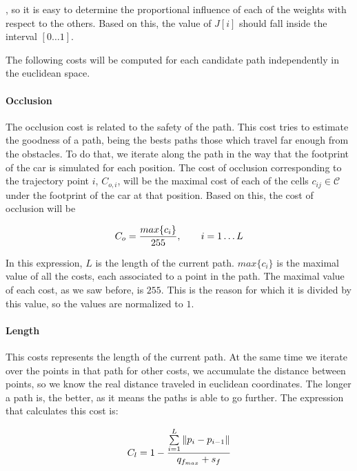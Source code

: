 , so it is easy to determine the proportional influence of each of the weights with respect to the others. Based on this, the value of $J[i]$ should fall inside the interval $[0\dots1]$.

The following costs will be computed for each candidate path independently in the euclidean space.

\paragraph{Occlusion}\label{ch:chapter07_01_04_00_01}

The occlusion cost is related to the safety of the path. This cost tries to estimate the goodness of a path, being the bests paths those which travel far enough from the obstacles. To do that, we iterate along the path in the way that the footprint of the car is simulated for each position. The cost of occlusion corresponding to the trajectory point $i$, $C_{o,i}$, will be the maximal cost of each of the cells $c_{ij} \in \mathcal{C}$ under the footprint of the car at that position. Based on this, the cost of occlusion will be

\begin{equation}\label{eq:cp07_occlusion_cost}
C_o = {{max\{c_i\}} \over 255}, ~~~~~~ i=1 \dots L
\end{equation}

In this expression, $L$ is the length of the current path. $max\{c_i\}$ is the maximal value of all the costs, each associated to a point in the path. The maximal value of each cost, as we saw before, is $255$. This is the reason for which it is divided by this value, so the values are normalized to $1$.

\paragraph{Length}\label{ch:chapter07_01_04_00_02}

This costs represents the length of the current path. At the same time we iterate over the points in that path for other costs, we accumulate the distance between points, so we know the real distance traveled in euclidean coordinates. The longer a path is, the better, as it means the paths is able to go further. The expression that calculates this cost is:

\begin{equation}\label{eq:cp07_length_cost}
C_l = 1- {{\sum\limits_{i=1}^{L}\|p_i - p_{i - 1}\|} \over {q_{f_{max}} + s_f}}
\end{equation}

